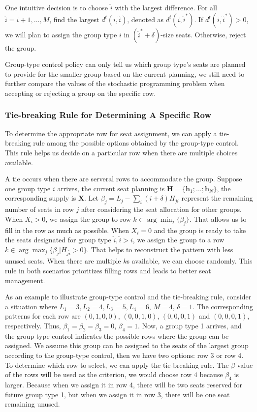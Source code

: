 One intuitive decision is to choose $\hat{i}$ with the largest difference. For all $\hat{i} = {i}+1, \ldots, M$, find the largest $d^{t}({i},\hat{i})$, denoted as $d^{t}({i},\hat{i}^{*})$. If $d^{t}({i},\hat{i}^{*}) >0$, we will plan to assign the group type ${i}$ in $(\hat{i}^{*}+\delta)$-size seats. Otherwise, reject the group.

Group-type control policy can only tell us which group type's seats are planned to provide for the smaller group based on the current planning, we still need to further compare the values of the stochastic programming problem when accepting or rejecting a group on the specific row. 

\subsubsection{Tie-breaking Rule for Determining A Specific Row}\label{tie-break}
To determine the appropriate row for seat assignment, we can apply a tie-breaking rule among the possible options obtained by the group-type control. This rule helps us decide on a particular row when there are multiple choices available.

A tie occurs when there are serveral rows to accommodate the group. Suppose one group type ${i}$ arrives, the current seat planning is $\bm{H} = \{\bm{h}_{1}; \ldots; \bm{h}_{N}\}$, the corresponding supply is $\bm{X}$. Let $\beta_{j} = L_j - \sum_{i} (i+\delta) H_{ji}$ represent the remaining number of seats in row $j$ after considering the seat allocation for other groups. When $X_{i} > 0$, we assign the group to row $k \in \arg \min_{j} \{\beta_{j}\}$. That allows us to fill in the row as much as possible. When $X_{i} = 0$ and the group is ready to take the seats designated for group type $\hat{i}, \hat{i}>i$, we assign the group to a row $k \in \arg \max_{j} \{\beta_{j}| H_{j \hat{i}}>0\}$. That helps to reconstruct the pattern with less unused seats. When there are multiple $k$s available, we can choose randomly. This rule in both scenarios prioritizes filling rows and leads to better seat management.

As an example to illustrate group-type control and the tie-breaking rule, consider a situation where $L_1 =3, L_2 = 4, L_3 =5, L_4 =6$, $M =4$, $\delta =1$. The corresponding patterns for each row are $(0,1,0,0)$, $(0,0,1,0)$, $(0,0,0,1)$ and $(0,0,0,1)$, respectively. Thus, $\beta_1 = \beta_2 = \beta_3 =0$, $\beta_4 =1$. Now, a group type 1 arrives, and the group-type control indicates the possible rows where the group can be assigned. We assume this group can be assigned to the seats of the largest group according to the group-type control, then we have two options: row 3 or row 4. To determine which row to select, we can apply the tie-breaking rule. The $\beta$ value of the rows will be used as the criterion, we would choose row 4 because $\beta_4$ is larger. Because when we assign it in row 4, there will be two seats reserved for future group type 1, but when we assign it in row 3, there will be one seat remaining unused.

